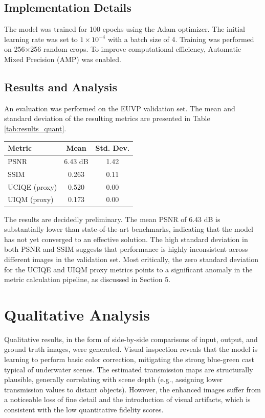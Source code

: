 \documentclass[10pt,twocolumn,letterpaper]{article}
\begin{document}
\subsection{Implementation Details}
The model was trained for 100 epochs using the Adam optimizer. The initial learning rate was set to $1 \times 10^{-4}$ with a batch size of 4. Training was performed on 256$\times$256 random crops. To improve computational efficiency, Automatic Mixed Precision (AMP) was enabled.

\subsection{Results and Analysis}
An evaluation was performed on the EUVP validation set. The mean and standard deviation of the resulting metrics are presented in Table \ref{tab:results_quant}.

\begin{center}
\label{tab:results_quant}
\begin{tabular}{@{}lcc@{}}
\toprule
Metric & Mean & Std. Dev. \\
\midrule
PSNR & 6.43 dB & 1.42 \\
SSIM & 0.263 & 0.11 \\
UCIQE (proxy) & 0.520 & 0.00 \\
UIQM (proxy) & 0.173 & 0.00 \\
\bottomrule
\end{tabular}
\end{center}

The results are decidedly preliminary. The mean PSNR of 6.43 dB is substantially lower than state-of-the-art benchmarks, indicating that the model has not yet converged to an effective solution. The high standard deviation in both PSNR and SSIM suggests that performance is highly inconsistent across different images in the validation set. Most critically, the zero standard deviation for the UCIQE and UIQM proxy metrics points to a significant anomaly in the metric calculation pipeline, as discussed in Section 5.

\section{Qualitative Analysis}
Qualitative results, in the form of side-by-side comparisons of input, output, and ground truth images, were generated. Visual inspection reveals that the model is learning to perform basic color correction, mitigating the strong blue-green cast typical of underwater scenes. The estimated transmission maps are structurally plausible, generally correlating with scene depth (e.g., assigning lower transmission values to distant objects). However, the enhanced images suffer from a noticeable loss of fine detail and the introduction of visual artifacts, which is consistent with the low quantitative fidelity scores.
\end{document}
